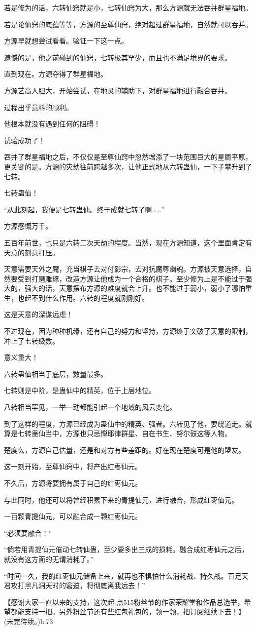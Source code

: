 \begin{this_body}
若是修为的话，六转仙窍就是小，七转仙窍为大，那么方源就无法吞并群星福地。

若是论仙窍的底蕴等等，方源的至尊仙窍，绝对超过群星福地，自然就可以吞并。

方源早就想尝试看看。验证一下这一点。

遗憾的是，他之前碰到的仙窍，七转极其罕少，而且也不满足境界的要求。

直到现在。方源夺得了群星福地。

方源艺高人胆大，开始尝试，在地灵的辅助下，对群星福地进行融合吞并。

过程出乎意料的顺利。

他根本就没有遇到任何的阻碍！

试验成功了！

吞并了群星福地之后，不仅仅是至尊仙窍中忽然增添了一块范围巨大的星屑平原，更关键的是。方源的灾劫往前跨越多次，让他正式地从六转蛊仙，一下子攀升到了七转。

七转蛊仙！

“从此刻起，我便是七转蛊仙。终于成就七转了啊……”

方源感慨万千。

五百年前世，也只是六转二次天劫的程度。当然，现在方源知道，这个里面肯定有天意的刻意打压。

天意需要天外之魔，充当棋子去对付影宗，去对抗魔尊幽魂。方源被天意选择，自然要受到打磨雕琢，改造方源让他成为一个合格的棋子。至少修为上是不能过于强大的，强大的话，天意摆布方源的难度就会上升。也不能过于弱小，弱小了哪怕重生，也起不到什么作用。六转的程度就刚刚好。

这是天意的深谋远虑！

不过现在，因为种种机缘，还有自己的努力和坚持，方源终于突破了天意的限制，冲上了七转级数。

意义重大！

六转蛊仙相当于底层，数量最多。

七转则是中阶，是蛊仙中的精英，位于上层地位。

八转相当罕见，一举一动都能引起一个地域的风云变化。

到了这样的程度，方源已经成为蛊仙中的精英、强者。六转见了他，要绕道走。就算是七转蛊仙当中，方源也只忌惮耶律群星、自在书生、努尔鼓这等人物。

楚度么，方源自己估量，还是和对方有些差距的。好在现在楚度可是他的盟友。

这一刻开始，至尊仙窍中，将产出红枣仙元。

不久后，方源将要拥有属于自己的红枣仙元。

与此同时，他还可以将曾经积累下来的青提仙元，进行融合，形成红枣仙元。

一百颗青提仙元，可以融合成一颗红枣仙元。

“必须要融合！”

“倘若用青提仙元催动七转仙蛊，至少要多出三成的损耗。融合成红枣仙元之后，就没有这方面的无谓消耗了。”

“时间一久，我的红枣仙元储备上来，就再也不惧怕什么消耗战、持久战。百足天君攻打黑凡洞天时的窘迫，将彻底离我远去！”

【感谢大家一直以来的支持，这次起-点515粉丝节的作家荣耀堂和作品总选举，希望都能支持一把。另外粉丝节还有些红包礼包的，领一领，把订阅继续下去！】(未完待续。)h.73

\end{this_body}

